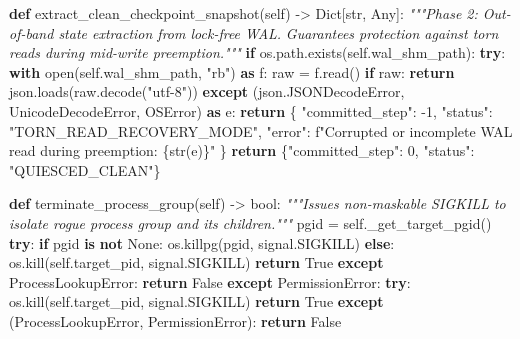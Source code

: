 \documentclass[
  10pt,letterpaper]{article}
\newenvironment{Shaded}{}{}
\newcommand{\BuiltInTok}[1]{\textcolor[rgb]{0.00,0.50,0.00}{#1}}
\newcommand{\CommentTok}[1]{\textcolor[rgb]{0.38,0.63,0.69}{\textit{#1}}}
\newcommand{\ControlFlowTok}[1]{\textcolor[rgb]{0.00,0.44,0.13}{\textbf{#1}}}
\newcommand{\DecValTok}[1]{\textcolor[rgb]{0.25,0.63,0.44}{#1}}
\newcommand{\ImportTok}[1]{\textcolor[rgb]{0.00,0.50,0.00}{\textbf{#1}}}
\newcommand{\KeywordTok}[1]{\textcolor[rgb]{0.00,0.44,0.13}{\textbf{#1}}}
\newcommand{\NormalTok}[1]{#1}
\newcommand{\OperatorTok}[1]{\textcolor[rgb]{0.40,0.40,0.40}{#1}}
\newcommand{\PreprocessorTok}[1]{\textcolor[rgb]{0.74,0.48,0.00}{#1}}
\newcommand{\SpecialCharTok}[1]{\textcolor[rgb]{0.25,0.44,0.63}{#1}}
\newcommand{\SpecialStringTok}[1]{\textcolor[rgb]{0.73,0.40,0.53}{#1}}
\newcommand{\StringTok}[1]{\textcolor[rgb]{0.25,0.44,0.63}{#1}}
\newcommand{\VariableTok}[1]{\textcolor[rgb]{0.10,0.09,0.49}{#1}}
\begin{document}
\begin{Shaded}
\begin{Highlighting}[]
    \KeywordTok{def}\NormalTok{ extract\_clean\_checkpoint\_snapshot(}\VariableTok{self}\NormalTok{) }\OperatorTok{{-}\textgreater{}}\NormalTok{ Dict[}\BuiltInTok{str}\NormalTok{, Any]:}
        \CommentTok{"""Phase 2: Out{-}of{-}band state extraction from lock{-}free WAL.}
\CommentTok{        Guarantees protection against torn reads during mid{-}write preemption."""}
        \ControlFlowTok{if}\NormalTok{ os.path.exists(}\VariableTok{self}\NormalTok{.wal\_shm\_path):}
            \ControlFlowTok{try}\NormalTok{:}
                \ControlFlowTok{with} \BuiltInTok{open}\NormalTok{(}\VariableTok{self}\NormalTok{.wal\_shm\_path, }\StringTok{"rb"}\NormalTok{) }\ImportTok{as}\NormalTok{ f:}
\NormalTok{                    raw }\OperatorTok{=}\NormalTok{ f.read()}
                \ControlFlowTok{if}\NormalTok{ raw:}
                    \ControlFlowTok{return}\NormalTok{ json.loads(raw.decode(}\StringTok{"utf{-}8"}\NormalTok{))}
            \ControlFlowTok{except}\NormalTok{ (json.JSONDecodeError, }\PreprocessorTok{UnicodeDecodeError}\NormalTok{, }\PreprocessorTok{OSError}\NormalTok{) }\ImportTok{as}\NormalTok{ e:}
                \ControlFlowTok{return}\NormalTok{ \{}
                    \StringTok{"committed\_step"}\NormalTok{: }\OperatorTok{{-}}\DecValTok{1}\NormalTok{,}
                    \StringTok{"status"}\NormalTok{: }\StringTok{"TORN\_READ\_RECOVERY\_MODE"}\NormalTok{,}
                    \StringTok{"error"}\NormalTok{: }\SpecialStringTok{f"Corrupted or incomplete WAL read during preemption: }\SpecialCharTok{\{}\BuiltInTok{str}\NormalTok{(e)}\SpecialCharTok{\}}\SpecialStringTok{"}
\NormalTok{                \}}
        \ControlFlowTok{return}\NormalTok{ \{}\StringTok{"committed\_step"}\NormalTok{: }\DecValTok{0}\NormalTok{, }\StringTok{"status"}\NormalTok{: }\StringTok{"QUIESCED\_CLEAN"}\NormalTok{\}}

    \KeywordTok{def}\NormalTok{ terminate\_process\_group(}\VariableTok{self}\NormalTok{) }\OperatorTok{{-}\textgreater{}} \BuiltInTok{bool}\NormalTok{:}
        \CommentTok{"""Issues non{-}maskable SIGKILL to isolate rogue process group and its children."""}
\NormalTok{        pgid }\OperatorTok{=} \VariableTok{self}\NormalTok{.\_get\_target\_pgid()}
        \ControlFlowTok{try}\NormalTok{:}
            \ControlFlowTok{if}\NormalTok{ pgid }\KeywordTok{is} \KeywordTok{not} \VariableTok{None}\NormalTok{:}
\NormalTok{                os.killpg(pgid, signal.SIGKILL)}
            \ControlFlowTok{else}\NormalTok{:}
\NormalTok{                os.kill(}\VariableTok{self}\NormalTok{.target\_pid, signal.SIGKILL)}
            \ControlFlowTok{return} \VariableTok{True}
        \ControlFlowTok{except} \PreprocessorTok{ProcessLookupError}\NormalTok{:}
            \ControlFlowTok{return} \VariableTok{False}
        \ControlFlowTok{except} \PreprocessorTok{PermissionError}\NormalTok{:}
            \ControlFlowTok{try}\NormalTok{:}
\NormalTok{                os.kill(}\VariableTok{self}\NormalTok{.target\_pid, signal.SIGKILL)}
                \ControlFlowTok{return} \VariableTok{True}
            \ControlFlowTok{except}\NormalTok{ (}\PreprocessorTok{ProcessLookupError}\NormalTok{, }\PreprocessorTok{PermissionError}\NormalTok{):}
                \ControlFlowTok{return} \VariableTok{False}


\end{Highlighting}
\end{Shaded}
\end{document}
